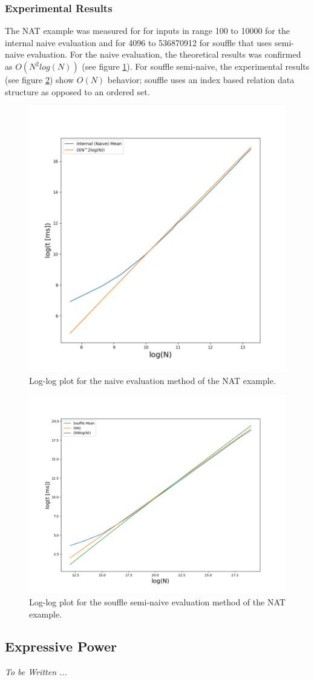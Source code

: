 \subsubsection{Experimental Results}
The NAT example was measured for for inputs in range 100 to 10000 for the internal naive evaluation and for 4096 to 536870912 for souffle that uses semi-naive evaluation. For the naive evaluation, the theoretical results was confirmed as $O(N^2 log(N))$ (see figure \ref{figure:internalloglog}). For souffle semi-naive, the experimental results (see figure \ref{figure:souffleloglog}) show $O(N)$ behavior; souffle uses an index based relation data structure as opposed to an ordered set.

\begin{figure}[!ht]
\includegraphics[width=.9\linewidth, height=12\baselineskip]{img/internalloglog.png}
\caption{Log-log plot for the naive evaluation method of the NAT example.}
\label{figure:internalloglog}
\end{figure}

\begin{figure}[!ht]
	\includegraphics[width=.9\linewidth, height=12\baselineskip]{img/souffleloglog.png}
	\caption{Log-log plot for the souffle semi-naive evaluation method of the NAT example.}
	\label{figure:souffleloglog}
\end{figure}

\subsection{Expressive Power}
\textit{To be Written ... }